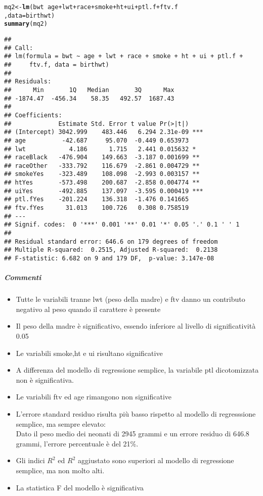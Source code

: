 \documentclass{article}\usepackage[]{graphicx}\usepackage[]{color}
\makeatletter
\newcommand{\hlopt}[1]{\textcolor[rgb]{0,0,0}{#1}}%
\newcommand{\hlstd}[1]{\textcolor[rgb]{0.345,0.345,0.345}{#1}}%
\newcommand{\hlkwb}[1]{\textcolor[rgb]{0.69,0.353,0.396}{#1}}%
\newcommand{\hlkwc}[1]{\textcolor[rgb]{0.333,0.667,0.333}{#1}}%
\newcommand{\hlkwd}[1]{\textcolor[rgb]{0.737,0.353,0.396}{\textbf{#1}}}%
\newenvironment{kframe}{%
 \def\at@end@of@kframe{}%
 \ifinner\ifhmode%
  \def\at@end@of@kframe{\end{minipage}}%
  \begin{minipage}{\columnwidth}%
 \fi\fi%
 \def\FrameCommand##1{\hskip\@totalleftmargin \hskip-\fboxsep
 \colorbox{shadecolor}{##1}\hskip-\fboxsep
     \hskip-\linewidth \hskip-\@totalleftmargin \hskip\columnwidth}%
 \MakeFramed {\advance\hsize-\width
   \@totalleftmargin\z@ \linewidth\hsize
   \@setminipage}}%
 {\par\unskip\endMakeFramed%
 \at@end@of@kframe}
\newenvironment{knitrout}{}{} %
\makeatother
\begin{document}
\begin{knitrout}
\color{fgcolor}\begin{kframe}
\begin{alltt}
\hlstd{mq2} \hlkwb{<-} \hlkwd{lm}\hlstd{(bwt} \hlopt{~} \hlstd{age}\hlopt{+} \hlstd{lwt} \hlopt{+} \hlstd{race} \hlopt{+} \hlstd{smoke} \hlopt{+} \hlstd{ht} \hlopt{+} \hlstd{ui} \hlopt{+} \hlstd{ptl.f} \hlopt{+} \hlstd{ftv.f}
          \hlstd{,}\hlkwc{data}\hlstd{=birthwt)}
\hlkwd{summary}\hlstd{(mq2)}
\end{alltt}
\begin{verbatim}
## 
## Call:
## lm(formula = bwt ~ age + lwt + race + smoke + ht + ui + ptl.f + 
##     ftv.f, data = birthwt)
## 
## Residuals:
##      Min       1Q   Median       3Q      Max 
## -1874.47  -456.34    58.35   492.57  1687.43 
## 
## Coefficients:
##             Estimate Std. Error t value Pr(>|t|)    
## (Intercept) 3042.999    483.446   6.294 2.31e-09 ***
## age          -42.687     95.070  -0.449 0.653973    
## lwt            4.186      1.715   2.441 0.015632 *  
## raceBlack   -476.904    149.663  -3.187 0.001699 ** 
## raceOther   -333.792    116.679  -2.861 0.004729 ** 
## smokeYes    -323.489    108.098  -2.993 0.003157 ** 
## htYes       -573.498    200.687  -2.858 0.004774 ** 
## uiYes       -492.885    137.097  -3.595 0.000419 ***
## ptl.fYes    -201.224    136.318  -1.476 0.141665    
## ftv.fYes      31.013    100.726   0.308 0.758519    
## ---
## Signif. codes:  0 '***' 0.001 '**' 0.01 '*' 0.05 '.' 0.1 ' ' 1
## 
## Residual standard error: 646.6 on 179 degrees of freedom
## Multiple R-squared:  0.2515,	Adjusted R-squared:  0.2138 
## F-statistic: 6.682 on 9 and 179 DF,  p-value: 3.147e-08
\end{verbatim}
\end{kframe}
\end{knitrout}

\subparagraph{Commenti}
\begin{itemize}
\item Tutte le variabili tranne lwt (peso della madre) e ftv danno un contributo negativo al peso quando il carattere è presente
\item Il peso della madre è significativo, essendo inferiore al livello di significatività 0.05
\item Le variabili smoke,ht e ui risultano significative
\item A differenza del modello di regressione semplice, la variabile ptl dicotomizzata non è significativa.
\item Le variabili ftv ed age rimangono non significative
\item L'errore standard residuo risulta più basso rispetto al modello di regresssione semplice, ma sempre elevato: \\Dato il peso medio dei neonati di 2945 grammi e  un errore residuo di 646.8 grammi, l'errore percentuale è del 21\%. 
\item Gli indici $R^2$ ed $R^2$ aggiustato sono superiori al modello di regressione semplice, ma non molto alti.
\item La statistica F del modello è significativa
\end{itemize}
\end{document}
